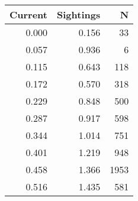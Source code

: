 \begin{tabular}{rrr}
\toprule
 Current &  Sightings &    N \\
\midrule
   0.000 &      0.156 &   33 \\
   0.057 &      0.936 &    6 \\
   0.115 &      0.643 &  118 \\
   0.172 &      0.570 &  318 \\
   0.229 &      0.848 &  500 \\
   0.287 &      0.917 &  598 \\
   0.344 &      1.014 &  751 \\
   0.401 &      1.219 &  948 \\
   0.458 &      1.366 & 1953 \\
   0.516 &      1.435 &  581 \\
\bottomrule
\end{tabular}
